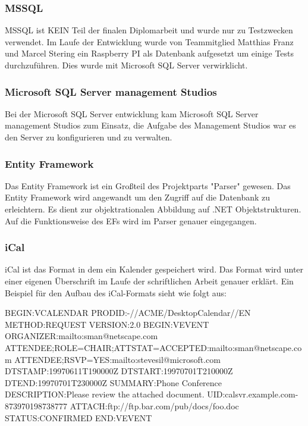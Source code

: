 \subsubsection {MSSQL}
\label{sec:MSSQL}
MSSQL ist KEIN Teil der finalen Diplomarbeit und wurde nur zu Testzwecken verwendet. Im Laufe der Entwicklung wurde von Teammitglied Matthias Franz und Marcel Stering ein Raspberry PI als Datenbank aufgesetzt um einige Tests durchzuführen. Dies wurde mit Microsoft SQL Server verwirklicht. 
\subsubsection {Microsoft SQL Server management Studios}
\label{sec:VisualStudio17Community}
Bei der Microsoft SQL Server entwicklung kam Microsoft SQL Server management Studios zum Einsatz, die Aufgabe des Management Studios war es den Server zu konfigurieren und zu verwalten. 
\subsubsection {Entity Framework}
\label{sec:VisualStudio17Community}
Das Entity Framework ist ein Großteil des Projektparts "Parser" gewesen. Das Entity Framework wird angewandt um den Zugriff auf die Datenbank zu erleichtern. Es dient zur objektrationalen Abbildung auf .NET Objektstrukturen. Auf die Funktionsweise des EFs wird im Parser genauer eingegangen.

\subsubsection {iCal}
\label{sec:VisualStudio17Community}
iCal ist das Format in dem ein Kalender gespeichert wird. Das Format wird unter einer eigenen Überschrift im Laufe der schriftlichen Arbeit genauer erklärt. 
Ein Beispiel für den Aufbau des iCal-Formats sieht wie folgt aus: 
\begin{flushleft}
BEGIN:VCALENDAR \break
   PRODID:-//ACME/DesktopCalendar//EN \break
   METHOD:REQUEST \break
   VERSION:2.0 \break
   BEGIN:VEVENT \break
   ORGANIZER:mailto:sman@netscape.com \break
   ATTENDEE;ROLE=CHAIR;ATTSTAT=ACCEPTED:mailto:sman@netscape.com \break
   ATTENDEE;RSVP=YES:mailto:stevesil@microsoft.com \break
   DTSTAMP:19970611T190000Z \break
   DTSTART:19970701T210000Z \break
   DTEND:19970701T230000Z \break
   SUMMARY:Phone Conference \break
   DESCRIPTION:Please review the attached document. \break
   UID:calsvr.example.com-873970198738777 \break
   ATTACH:ftp://ftp.bar.com/pub/docs/foo.doc \break
   STATUS:CONFIRMED \break
   END:VEVENT
\end{flushleft}
\cite{TechnologieiCalExample}
\justifying
